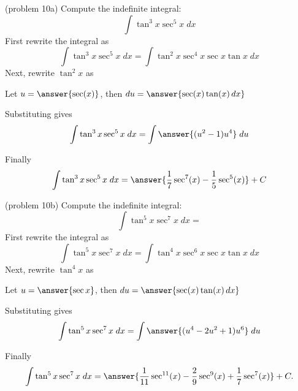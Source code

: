 \documentclass[handout]{ximera}
\begin{document}
\begin{problem}(problem 10a)
Compute the indefinite integral:
\[
\int \tan^3 x \sec^5 x\;dx
\]
First rewrite the integral as
\[
\int \tan^3 x \sec^5 x\;dx = \int \tan^2 x \sec^4 x \sec x \tan x \; dx
\]
Next, rewrite $\tan^2 x$ as
\begin{multipleChoice}
\end{multipleChoice}

Let $u = \answer{\sec(x)}$, then \; $du = \answer{\sec(x) \tan(x) \, dx}$

Substituting gives
\[
\int \tan^3 x \sec^5 x\;dx = \int \answer{(u^2 - 1)u^4} \; du
\]

Finally
\[
\int \tan^3 x \sec^5 x\;dx = \answer{\frac17 \sec^7(x) - \frac15 \sec^5(x)} + C
\]
\end{problem}




\begin{problem}(problem 10b)
Compute the indefinite integral:
\[
\int \tan^5 x \sec^7 x\;dx = 
\]
First rewrite the integral as
\[
\int \tan^5 x \sec^7 x\;dx = \int \tan^4 x \sec^6 x \sec x \tan x \; dx
\]
Next, rewrite $\tan^4 x$ as
\begin{multipleChoice}
\end{multipleChoice}

Let $u = \answer{\sec x}$, then \; $du = \answer{\sec(x) \tan(x) \, dx}$

Substituting gives
\[
\int \tan^5 x \sec^7 x\;dx = \int \answer{(u^4 -2u^2 + 1) u^6} \; du
\]

Finally
\[
\int \tan^5 x \sec^7 x\;dx =  \answer{\frac{1}{11} \sec^{11}(x) - \frac29 \sec^9(x) + \frac17 \sec^7(x)} + C.
\]
\end{problem}
\end{document}
